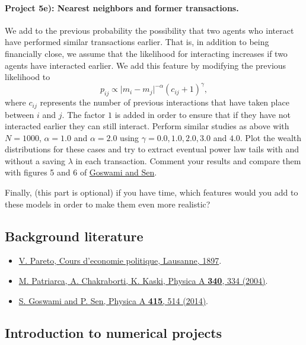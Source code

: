 \documentclass[%
oneside,                 %
final,                   %
10pt]{article}
\begin{document}
\paragraph{Project 5e): Nearest neighbors and former  transactions.}
We add to the previous probability the possibility that two agents who interact have performed similar transactions earlier. That is, in addition to being financially close, we assume that the likelihood for interacting increases if two agents have interacted earlier. 
We add this feature by modifying the previous likelihood to
\[
p_{ij} \propto \vert m_i-m_j\vert^{-\alpha}\left(c_{ij}+1\right)^{\gamma},
\]
where $c_{ij}$ represents the number of  previous interactions that have taken place between $i$ and $j$. The factor $1$ is added in order to ensure that if they have not interacted earlier they can still interact.  Perform similar studies as above with $N=1000$, $\alpha=1.0$ and $\alpha=2.0$ using $\gamma = 0.0, 1.0, 2.0, 3.0$ and $4.0$. Plot the wealth distributions for these cases and try to extract eventual power law tails with and without a saving $\lambda$ in each transaction. Comment your results and compare them with figures 5 and 6 of \href{{http://www.sciencedirect.com/science/article/pii/S0378437114006967}}{Goswami and Sen}.  

Finally, (this part is optional) if you have time, which features would you add to these models in order to make them even more realistic? 

\subsection{Background literature}

\begin{itemize}
  \item \href{{http://www.institutcoppet.org/2012/05/08/cours-deconomie-politique-1896-de-vilfredo-pareto}}{V. Pareto, Cours d'economie politique, Lausanne, 1897}.

  \item \href{{http://www.sciencedirect.com/science/article/pii/S0378437104004327}}{M. Patriarca, A. Chakraborti, K. Kaski, Physica A \textbf{340}, 334 (2004)}.

  \item \href{{http://www.sciencedirect.com/science/article/pii/S0378437114006967}}{S. Goswami and P. Sen, Physica A \textbf{415}, 514 (2014)}.
\end{itemize}

\noindent
\subsection{Introduction to numerical projects}
\end{document}
